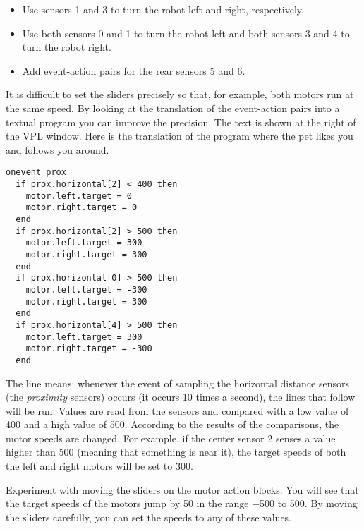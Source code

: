\begin{itemize}
\item Use sensors 1 and 3 to turn the robot left and right,
respectively.
\item Use both sensors 0 and 1 to turn the robot left and both sensors 3
and 4 to turn the robot right.
\item Add event-action pairs for the rear sensors 5 and 6.
\end{itemize}


It is difficult to set the sliders precisely so that, for example, both
motors run at the same speed. By looking at the translation of the
event-action pairs into a textual program you can improve the precision.
The text is shown at the right of the VPL window.
Here is the translation of the program where the
pet likes you and follows you around.

\begin{small}
\begin{verbatim}
onevent prox
  if prox.horizontal[2] < 400 then
    motor.left.target = 0
    motor.right.target = 0
  end
  if prox.horizontal[2] > 500 then
    motor.left.target = 300
    motor.right.target = 300
  end
  if prox.horizontal[0] > 500 then
    motor.left.target = -300
    motor.right.target = 300
  end
  if prox.horizontal[4] > 500 then
    motor.left.target = 300
    motor.right.target = -300
  end
\end{verbatim}
\end{small}

The line  means: whenever the event of sampling the
horizontal distance sensors (the \emph{proximity} sensors) occurs (it
occurs 10 times a second), the lines that follow will be run. Values are
read from the sensors and compared with a low value of 400 and a high
value of 500. According to the results of the comparisons, the motor
speeds are changed. For example, if the center sensor 2 senses a value
higher than 500 (meaning that something is near it), the target speeds
of both the left and right motors will be set to 300.

Experiment with moving the sliders on the motor action blocks. You will
see that the target speeds of the motors jump by 50 in the range $-$500
to 500. By moving the sliders carefully, you can set the speeds to any
of these values.
